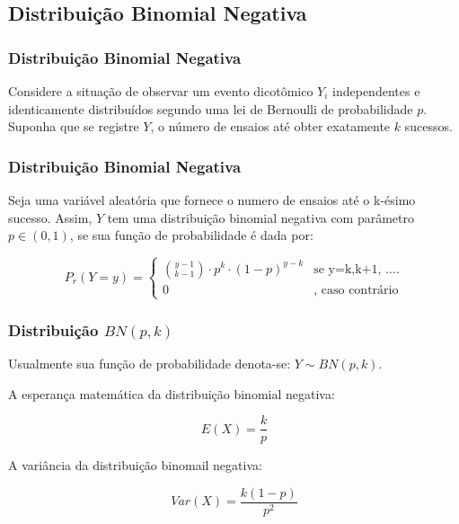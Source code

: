 \subsection{Distribuição Binomial Negativa}
\begin{frame}
\frametitle{Distribuição Binomial Negativa}
Considere a situação de observar um evento dicotômico $Y_{i}$ independentes e identicamente distribuídos segundo uma lei de Bernoulli de probabilidade $p$. Suponha que se registre $Y$, o número de ensaios até obter exatamente $k$ sucessos. 

\end{frame}

\begin{frame}
\frametitle{Distribuição Binomial Negativa}

Seja uma variável aleatória que fornece o numero de ensaios até o k-ésimo sucesso. 
Assim, $Y$ tem uma distribuição binomial negativa com parâmetro $p \in (0,1)$, 
se sua função de probabilidade é dada por:

\begin{displaymath}
P_{r}(Y=y)=\left\{ \begin{array}{ll}
\binom{y-1}{k-1} \cdot p^{k} \cdot (1-p)^{y-k} & \textrm{se  y=k,k+1, \ldots.}\\
0 & \textrm{, caso contrário}
\end{array} \right.
\end{displaymath}


\end{frame}

\begin{frame}
\frametitle{Distribui\c c\~ ao $BN(p,k)$}

Usualmente sua função de probabilidade denota-se: $Y \sim BN(p,k)$.\pause

A esperança matemática da distribuição binomial negativa:

\begin{equation}
\label{eq:esp}
E(X) = {\frac{k}{p}}
\end{equation}\pause

A variância da distribuição binomail negativa:

\begin{equation}
\label{eq:var}
Var(X) = {\frac{k(1-p)}{p^{2}}}
\end{equation}

\end{frame}

